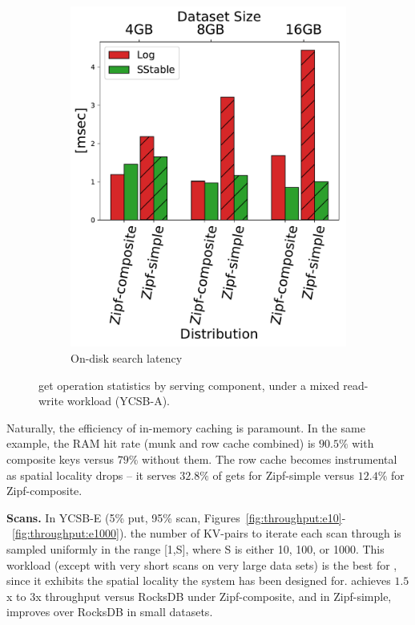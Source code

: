 \begin{figure}[htb]
\begin{subfigure}{0.49\linewidth}
\includegraphics[width=\textwidth]{figs/Latency_A.pdf}
\caption{On-disk search latency}
\label{fig:readstat:lat}
\end{subfigure}
\caption{{\sys\/ get operation statistics by serving component, under a mixed read-write workload (YCSB-A).}}
\label{fig:readstat}
\end{figure}

Naturally, the efficiency of in-memory caching is paramount. In the same example, the RAM hit rate 
(munk and row cache combined) is 
$90.5\%$ with composite keys versus $79\%$ without them. The row cache becomes instrumental as spatial locality drops --
 it serves $32.8\%$ of gets for Zipf-simple versus $12.4\%$ for Zipf-composite. 


{\bf Scans.} In YCSB-E (5\% put, 95\% scan, Figures~\ref{fig:throughput:e10}-~\ref{fig:throughput:e1000}).
the number of KV-pairs to iterate each scan through is  
sampled uniformly in the range [1,S], where S is either 10, 100, or 1000. 
This workload (except with very short scans on very large data sets) is the best for \sys, since it exhibits the spatial locality the system has been designed for. 
\sys\/ achieves $1.5$x to $3$x throughput versus RocksDB under Zipf-composite, and in Zipf-simple, improves over RocksDB in small datasets. 
 
